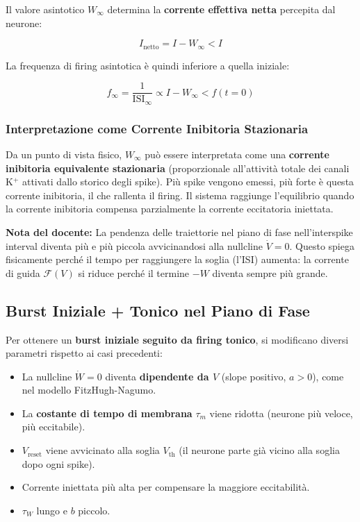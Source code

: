 Il valore asintotico $W_\infty$ determina la \textbf{corrente effettiva netta} percepita dal neurone:

\begin{equation}
I_{\text{netto}} = I - W_\infty < I
\end{equation}

La frequenza di firing asintotica è quindi inferiore a quella iniziale:

\begin{equation}
f_\infty = \frac{1}{\text{ISI}_\infty} \propto I - W_\infty < f(t=0)
\end{equation}

\subsubsection{Interpretazione come Corrente Inibitoria Stazionaria}

Da un punto di vista fisico, $W_\infty$ può essere interpretata come una \textbf{corrente inibitoria equivalente stazionaria} (proporzionale all'attività totale dei canali K$^+$ attivati dallo storico degli spike). Più spike vengono emessi, più forte è questa corrente inibitoria, il che rallenta il firing. Il sistema raggiunge l'equilibrio quando la corrente inibitoria compensa parzialmente la corrente eccitatoria iniettata.

\begin{tcolorbox}[colback=gray!5, colframe=gray!40, arc=2mm, boxrule=0.5pt]
\textbf{Nota del docente:} La pendenza delle traiettorie nel piano di fase nell'interspike interval diventa più e più piccola avvicinandosi alla nullcline $\dot{V} = 0$. Questo spiega fisicamente perché il tempo per raggiungere la soglia (l'ISI) aumenta: la corrente di guida $\mathcal{F}(V)$ si riduce perché il termine $-W$ diventa sempre più grande.
\end{tcolorbox}


\subsection{Burst Iniziale + Tonico nel Piano di Fase}


Per ottenere un \textbf{burst iniziale seguito da firing tonico}, si modificano diversi parametri rispetto ai casi precedenti:

\begin{itemize}
    \item La nullcline $\dot{W} = 0$ diventa \textbf{dipendente da $V$} (slope positivo, $a > 0$), come nel modello FitzHugh-Nagumo.
    \item La \textbf{costante di tempo di membrana} $\tau_m$ viene ridotta (neurone più veloce, più eccitabile).
    \item $V_{\text{reset}}$ viene avvicinato alla soglia $V_{\text{th}}$ (il neurone parte già vicino alla soglia dopo ogni spike).
    \item Corrente iniettata più alta per compensare la maggiore eccitabilità.
    \item $\tau_W$ lungo e $b$ piccolo.
\end{itemize}

